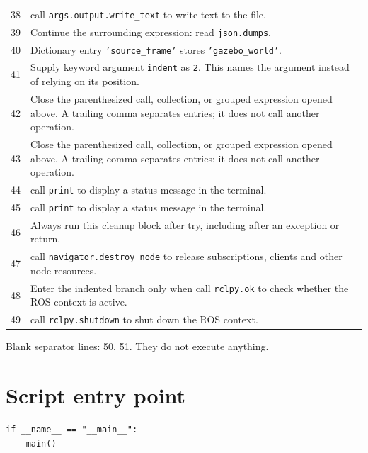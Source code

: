 \documentclass[11pt,a4paper]{book}
\begin{document}
\begin{longtable}{r p{}}
38 & call \texttt{args.output.write\_text} to write text to the file. \\

39 & Continue the surrounding expression: read \texttt{json.dumps}. \\

40 & Dictionary entry \texttt{'source\_frame'} stores \texttt{'gazebo\_world'}. \\

41 & Supply keyword argument \texttt{indent} as \texttt{2}. This names the argument instead of relying on its position. \\

42 & Close the parenthesized call, collection, or grouped expression opened above. A trailing comma separates entries; it does not call another operation. \\

43 & Close the parenthesized call, collection, or grouped expression opened above. A trailing comma separates entries; it does not call another operation. \\

44 & call \texttt{print} to display a status message in the terminal. \\

45 & call \texttt{print} to display a status message in the terminal. \\

46 & Always run this cleanup block after try, including after an exception or return. \\

47 & call \texttt{navigator.destroy\_node} to release subscriptions, clients and other node resources. \\

48 & Enter the indented branch only when call \texttt{rclpy.ok} to check whether the ROS context is active. \\

49 & call \texttt{rclpy.shutdown} to shut down the ROS context. \\

\end{longtable}

Blank separator lines: 50, 51. They do not execute anything.

\section{Script entry point}

\begin{lstlisting}[firstnumber=52]
if __name__ == "__main__":
    main()
\end{lstlisting}
\end{document}
